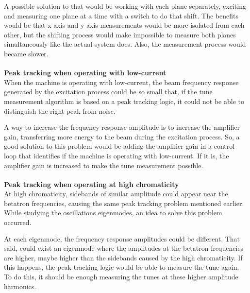A possible solution to that would be working with each plane separately, exciting and measuring one plane at a time with a switch to do that shift. The benefits would be that x-axis and y-axis measurements would be more isolated from each other, but the shifting process would make impossible to measure both planes simultaneously like the actual system does. Also, the measurement process would became slower.\\ \\

\noindent
\textbf{Peak tracking when operating with low-current}\\

When the machine is operating with low-current, the beam frequency response generated by the excitation process could be so small that, if the tune measurement algorithm is based on a peak tracking logic, it could not be able to distinguish the right peak from noise.

A way to increase the frequency response amplitude is to increase the amplifier gain, transferring more energy to the beam during the excitation process. So, a good solution to this problem would be adding the amplifier gain in a control loop that identifies if the machine is operating with low-current. If it is, the amplifier gain is increased to make the tune measurement possible.\\ \\

\noindent
\textbf{Peak tracking when operating at high chromaticity}\\

At high chromaticity, sidebands of similar amplitude could appear near the betatron frequencies, causing the same peak tracking problem mentioned earlier. While studying the oscillations eigenmodes, an idea to solve this problem occurred.

At each eigenmode, the frequency response amplitudes could be different. That said, could exist an eigenmode where the amplitudes at the betatron frequencies are higher, maybe higher than the sidebands caused by the high chromaticity. If this happens, the peak tracking logic would be able to measure the tune again. To do this, it should be enough measuring the tunes at these higher amplitude harmonics.

\pagebreak